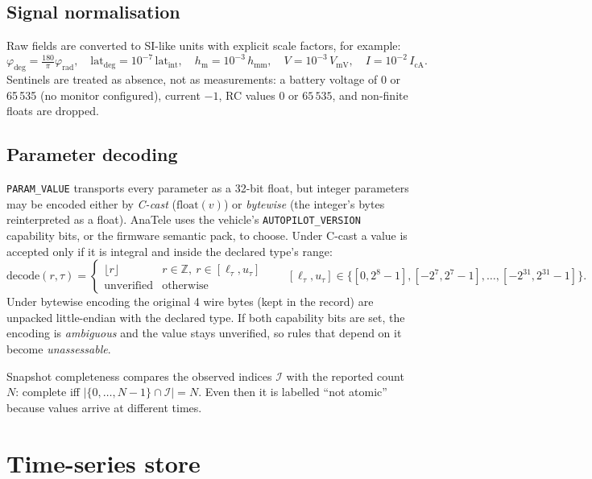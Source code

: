 \documentclass[11pt,a4paper]{article}
\newcommand{\code}[1]{\texttt{#1}}
\begin{document}
\subsection{Signal normalisation}
Raw fields are converted to SI-like units with explicit scale factors, for example:
\[
\varphi_{\deg} = \tfrac{180}{\pi}\varphi_{\text{rad}},\quad
\text{lat}_{\deg} = 10^{-7}\,\text{lat}_{\text{int}},\quad
h_{\text{m}} = 10^{-3}\,h_{\text{mm}},\quad
V = 10^{-3}\,V_{\text{mV}},\quad I = 10^{-2}\,I_{\text{cA}}.
\]
Sentinels are treated as absence, not as measurements: a battery voltage of 0 or 65\,535 (no
monitor configured), current $-1$, RC values $0$ or $65\,535$, and non-finite floats are dropped.

\subsection{Parameter decoding}
\code{PARAM\_VALUE} transports every parameter as a 32-bit float, but integer parameters may be
encoded either by \emph{C-cast} ($\text{float}(v)$) or \emph{bytewise} (the integer's bytes
reinterpreted as a float). AnaTele uses the vehicle's \code{AUTOPILOT\_VERSION} capability bits, or
the firmware semantic pack, to choose. Under C-cast a value is accepted only if it is integral and
inside the declared type's range:
\[
\text{decode}(r,\tau)=
\begin{cases}
\lfloor r\rfloor & r\in\mathbb{Z},\ r\in[\ell_\tau,u_\tau]\\
\text{unverified} & \text{otherwise}
\end{cases}
\qquad
[\ell_\tau,u_\tau]\in\{[0,2^8\!-\!1],[-2^7,2^7\!-\!1],\dots,[-2^{31},2^{31}\!-\!1]\}.
\]
Under bytewise encoding the original 4 wire bytes (kept in the record) are unpacked little-endian
with the declared type. If both capability bits are set, the encoding is \emph{ambiguous} and the
value stays unverified, so rules that depend on it become \emph{unassessable}.

Snapshot completeness compares the observed indices $\mathcal{I}$ with the reported count $N$:
complete iff $|\{0,\dots,N-1\}\cap\mathcal{I}| = N$. Even then it is labelled ``not atomic''
because values arrive at different times.

\section{Time-series store}
\end{document}
